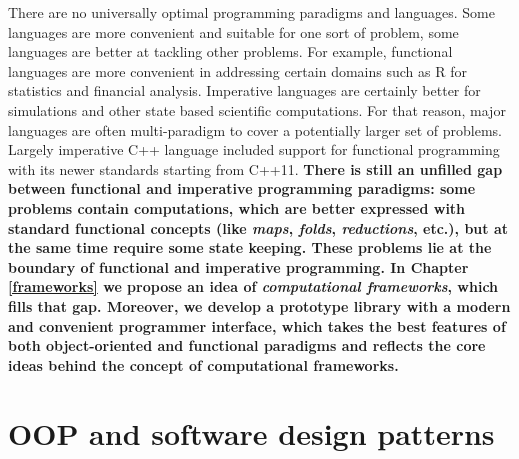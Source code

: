 \quad There are no universally optimal programming paradigms and languages. Some languages are more convenient and suitable for one sort of problem, some languages are better at tackling other problems. For example, functional languages are more convenient in addressing certain domains such as R for statistics and financial analysis. Imperative languages are certainly better for simulations and other state based scientific computations. For that reason, major languages are often multi-paradigm to cover a potentially larger set of problems. Largely imperative C++ language included support for functional programming with its newer standards starting from C++11.\newline\null
\quad \textbf{There is still an unfilled gap between functional and imperative programming paradigms: some problems contain computations, which are better expressed with standard functional concepts (like \textit{maps}, \textit{folds}, \textit{reductions}, etc.), but at the same time require some state keeping. These problems lie at the boundary of functional and imperative programming. In Chapter \ref{frameworks} we propose an idea of \textit{computational frameworks}, which fills that gap. Moreover, we develop a prototype library \cite{frameworks-repo} with a modern and convenient programmer interface, which takes the best features of both object-oriented and functional paradigms and reflects the core ideas behind the concept of computational frameworks.}
\section{OOP and software design patterns}
\label{background_oop_design}

